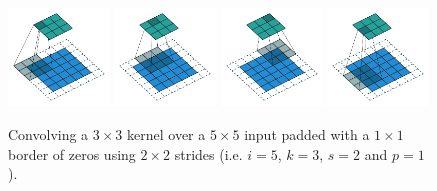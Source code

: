 \documentclass{report}
\begin{document}
\begin{figure}[p]
    \centering
    \includegraphics[width=0.24\textwidth]{pdf/padding_strides_00.pdf}
    \includegraphics[width=0.24\textwidth]{pdf/padding_strides_01.pdf}
    \includegraphics[width=0.24\textwidth]{pdf/padding_strides_02.pdf}
    \includegraphics[width=0.24\textwidth]{pdf/padding_strides_03.pdf}
    \caption{\label{fig:padding_strides} Convolving a $3 \times 3$ kernel over a
        $5 \times 5$ input padded with a $1 \times 1$ border of zeros using $2
        \times 2$ strides (i.e.  $i = 5$, $k = 3$, $s = 2$ and $p = 1$).}
\end{figure}
\end{document}
